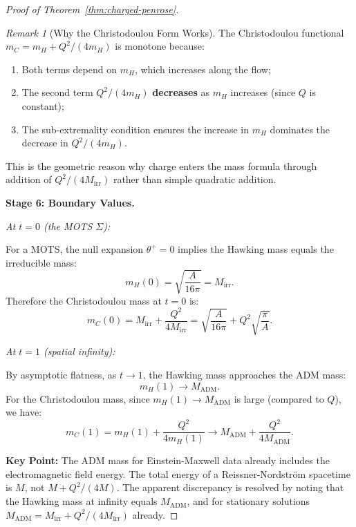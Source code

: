\documentclass[12pt]{article}
\theoremstyle{plain}
\theoremstyle{definition}
\theoremstyle{remark}
\newtheorem{remark}[theorem]{Remark}
\newcommand{\ADM}{\mathrm{ADM}}
\begin{document}
\begin{proof}[Proof of Theorem~\ref{thm:charged-penrose}]
\begin{remark}[Why the Christodoulou Form Works]
The Christodoulou functional $m_C = m_H + Q^2/(4m_H)$ is monotone because:
\begin{enumerate}
    \item Both terms depend on $m_H$, which increases along the flow;
    \item The second term $Q^2/(4m_H)$ \textbf{decreases} as $m_H$ increases (since $Q$ is constant);
    \item The sub-extremality condition ensures the increase in $m_H$ dominates the decrease in $Q^2/(4m_H)$.
\end{enumerate}
This is the geometric reason why charge enters the mass formula through addition of $Q^2/(4M_{\mathrm{irr}})$ rather than simple quadratic addition.
\end{remark}

\textbf{Stage 6: Boundary Values.}

\textit{At $t = 0$ (the MOTS $\Sigma$):}

For a MOTS, the null expansion $\theta^+ = 0$ implies the Hawking mass equals the irreducible mass:
\begin{equation}
    m_H(0) = \sqrt{\frac{A}{16\pi}} = M_{\mathrm{irr}}.
\end{equation}
Therefore the Christodoulou mass at $t = 0$ is:
\begin{equation}
    m_C(0) = M_{\mathrm{irr}} + \frac{Q^2}{4M_{\mathrm{irr}}} = \sqrt{\frac{A}{16\pi}} + Q^2\sqrt{\frac{\pi}{A}}.
\end{equation}

\textit{At $t = 1$ (spatial infinity):}

By asymptotic flatness, as $t \to 1$, the Hawking mass approaches the ADM mass:
\begin{equation}
    m_H(1) \to M_{\ADM}.
\end{equation}
For the Christodoulou mass, since $m_H(1) \to M_{\ADM}$ is large (compared to $Q$), we have:
\begin{equation}
    m_C(1) = m_H(1) + \frac{Q^2}{4m_H(1)} \to M_{\ADM} + \frac{Q^2}{4M_{\ADM}}.
\end{equation}

\textbf{Key Point:} The ADM mass for Einstein-Maxwell data already includes the electromagnetic field energy. The total energy of a Reissner-Nordstr\"om spacetime is $M$, not $M + Q^2/(4M)$. The apparent discrepancy is resolved by noting that the Hawking mass at infinity equals $M_{\ADM}$, and for stationary solutions $M_{\ADM} = M_{\mathrm{irr}} + Q^2/(4M_{\mathrm{irr}})$ already.


\end{proof}
\end{document}
